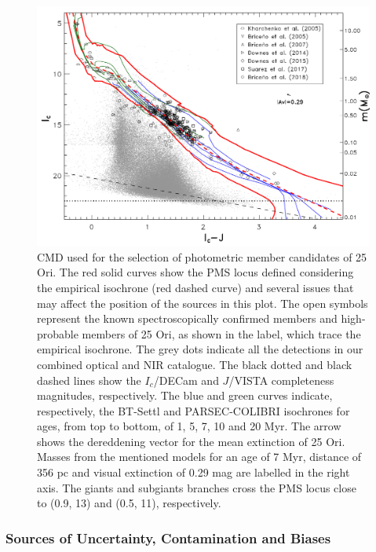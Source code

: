 \documentclass[12pt]{article}
\begin{document}
\begin{figure}
	\includegraphics[width=1.0\textwidth]{IvsI-J}
	\caption[$I_c$ vs $I_c-J$ diagram for the selection of the photometric member candidates.]{CMD used for the selection of photometric member candidates of 25 Ori. The red solid curves show the PMS locus defined considering the empirical isochrone (red dashed curve) and several issues that may affect the position of the sources in this plot. The open symbols represent the known spectroscopically confirmed members \citep{Briceno2005,Briceno2007,Downes2014,Downes2015,Suarez2017,Briceno2018} and high-probable members \citep{Kharchenko2005} of 25 Ori, as shown in the label, which trace the empirical isochrone. The grey dots indicate all the detections in our combined optical and NIR catalogue. The black dotted and black dashed lines show the $I_c$/DECam and $J$/VISTA completeness magnitudes, respectively. The blue and green curves indicate, respectively, the BT-Settl and PARSEC-COLIBRI isochrones for ages, from top to bottom, of 1, 5, 7, 10 and 20 Myr. The arrow shows the dereddening vector for the mean extinction of 25 Ori. Masses from the mentioned models for an age of 7 Myr, distance of 356 pc and visual extinction of 0.29 mag are labelled in the right axis. The giants and subgiants branches cross the PMS locus close to (0.9, 13) and (0.5, 11), respectively.}
	\label{fig_IMF:CMD}
\end{figure}

\subsubsection{Sources of Uncertainty, Contamination and Biases}
\label{sec_IMF:uncertainties}
\end{document}
